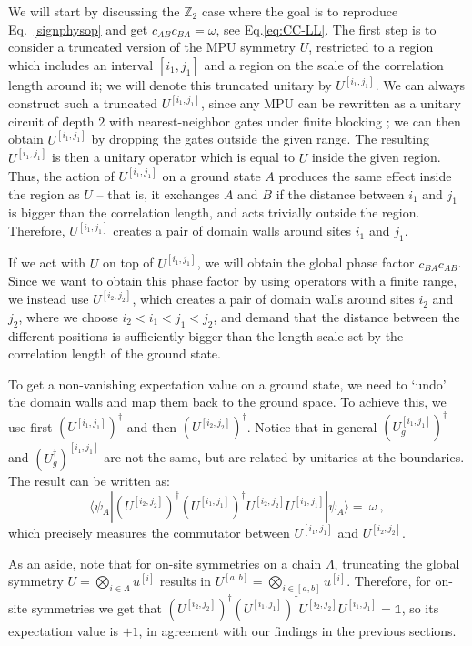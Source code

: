 \documentclass[aps,pra,export,nofootinbib]{revtex4-2}
\newcommand{\id}{\mathbb{1}}
\begin{document}
We will start by discussing the $\mathbb{Z}_2$ case where the goal is to reproduce Eq.~\eqref{signphysop} and get $c_{AB}c_{BA}=\omega$, see Eq.\eqref{eq:CC-LL}. The first step is to consider a truncated version of the MPU symmetry $U$, restricted to a region which includes an
interval $[i_1, j_1]$ and a region on the scale of the correlation length around it; we will denote this truncated unitary by $U^{[i_1,j_1]}$. We can always
construct such a truncated $U^{[i_1,j_1]}$, since any MPU can be rewritten as a
unitary circuit of depth $2$ with nearest-neighbor gates under finite blocking
\cite{Cirac17B}; we can then obtain $U^{[i_1,j_1]}$ by dropping the gates
outside the given range. The resulting $U^{[i_1,j_1]}$ is then a unitary
operator which is equal to $U$ inside the given region. Thus, the action of
$U^{[i_1,j_1]}$ on a ground state $A$ produces the same effect inside the region
as $U$ -- that is, it exchanges $A$ and $B$ if the distance between $i_1$ and
$j_1$ is bigger than the correlation length, and acts trivially outside the
region. Therefore, $U^{[i_1,j_1]}$ creates a pair of domain walls around sites
$i_1$ and $j_1$.  


If we act with $U$ on top of $ U^{[i_1,j_1]}$, we will obtain the global phase
factor ${c}_{BA}{c}_{AB}$. Since we want to obtain this phase factor by using 
operators with a finite range, we instead use $U^{[i_2,j_2]}$, which creates a  pair of domain
walls around sites $i_2$ and $j_2$, where we choose  $i_2 < i_1 < j_1 < j_2$, and 
demand that the distance between the different positions is sufficiently bigger than the
length scale set by the correlation length of the ground state. 

To get a non-vanishing expectation value on a ground state, we need to `undo' the domain walls and map them back to the ground space. To achieve this, we use first $(U^{[i_1,j_1]})^\dagger$ and then $(U^{[i_2,j_2]})^\dagger$. Notice that in general $(U_g^{[i_1,j_1]})^\dagger$ and $(U_g^\dagger)^{[i_1,j_1]}$ are not the same, but are related by unitaries at the boundaries. The result can be written as:
%
\begin{equation}\label{detecZ2}
  \langle \psi_A | (U^{[i_2,j_2]})^\dagger (U^{[i_1,j_1]})^\dagger  U^{[i_2,j_2]}U^{[i_1,j_1]} | \psi_A \rangle  = \ \omega   \ ,
\end{equation} 
which precisely measures the commutator between $U^{[i_1,j_1]}$ and $U^{[i_2,j_2]}$.


As an aside, note that for  on-site symmetries on a chain $\Lambda$,  truncating the global symmetry $U= \bigotimes_{i\in \Lambda} u^{[i]}$ results in $U^{[a,b]}=\bigotimes_{i\in [a,b]} u^{[i]}$. Therefore, for on-site symmetries we get that $(U^{[i_2,j_2]})^\dagger (U^{[i_1,j_1]})^\dagger  U^{[i_2,j_2]}U^{[i_1,j_1]} =  \id$, so its expectation value is $+1$, in agreement with our findings in the previous sections.\\
\end{document}
